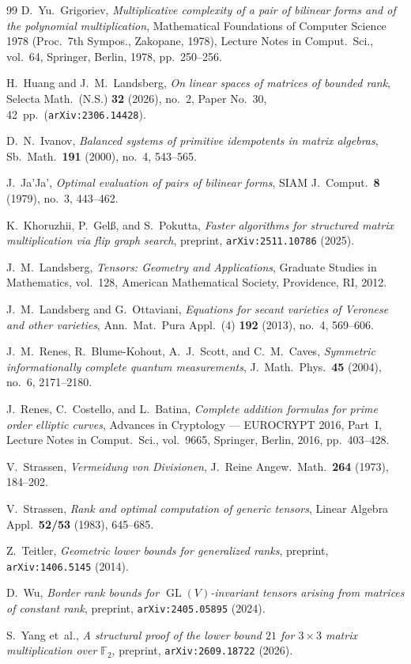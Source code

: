 \documentclass[11pt,reqno]{amsart}
\theoremstyle{definition}
\theoremstyle{remark}
\numberwithin{equation}{section}
\newcommand{\FF}{\mathbb{F}}
\DeclareMathOperator{\GL}{GL}
\begin{document}
\begin{thebibliography}{99}
D.~Yu.~Grigoriev,
\emph{Multiplicative complexity of a pair of bilinear forms and of the polynomial multiplication},
Mathematical Foundations of Computer Science 1978 (Proc.\ 7th Sympos., Zakopane, 1978),
Lecture Notes in Comput.\ Sci., vol.~64, Springer, Berlin, 1978, pp.~250--256.

H.~Huang and J.~M.~Landsberg,
\emph{On linear spaces of matrices of bounded rank},
Selecta Math.\ (N.S.) \textbf{32} (2026), no.~2, Paper No.~30, 42~pp.\ (\texttt{arXiv:2306.14428}).

D.~N.~Ivanov,
\emph{Balanced systems of primitive idempotents in matrix algebras},
Sb.\ Math.\ \textbf{191} (2000), no.~4, 543--565.

J.~Ja'Ja',
\emph{Optimal evaluation of pairs of bilinear forms},
SIAM J.\ Comput.\ \textbf{8} (1979), no.~3, 443--462.

K.~Khoruzhii, P.~Gel\ss, and S.~Pokutta,
\emph{Faster algorithms for structured matrix multiplication via flip graph search},
preprint, \texttt{arXiv:2511.10786} (2025).

J.~M.~Landsberg,
\emph{Tensors: Geometry and Applications},
Graduate Studies in Mathematics, vol.~128,
American Mathematical Society, Providence, RI, 2012.

J.~M.~Landsberg and G.~Ottaviani,
\emph{Equations for secant varieties of Veronese and other varieties},
Ann.\ Mat.\ Pura Appl.\ (4) \textbf{192} (2013), no.~4, 569--606.

J.~M.~Renes, R.~Blume-Kohout, A.~J.~Scott, and C.~M.~Caves,
\emph{Symmetric informationally complete quantum measurements},
J.~Math.\ Phys.\ \textbf{45} (2004), no.~6, 2171--2180.

J.~Renes, C.~Costello, and L.~Batina,
\emph{Complete addition formulas for prime order elliptic curves},
Advances in Cryptology --- EUROCRYPT 2016, Part~I,
Lecture Notes in Comput.\ Sci., vol.~9665, Springer, Berlin, 2016, pp.~403--428.

V.~Strassen,
\emph{Vermeidung von Divisionen},
J.~Reine Angew.\ Math.\ \textbf{264} (1973), 184--202.

V.~Strassen,
\emph{Rank and optimal computation of generic tensors},
Linear Algebra Appl.\ \textbf{52/53} (1983), 645--685.

Z.~Teitler,
\emph{Geometric lower bounds for generalized ranks},
preprint, \texttt{arXiv:1406.5145} (2014).

D.~Wu,
\emph{Border rank bounds for $\GL(V)$-invariant tensors arising from matrices of constant rank},
preprint, \texttt{arXiv:2405.05895} (2024).

S.~Yang et~al.,
\emph{A structural proof of the lower bound $21$ for $3 \times 3$ matrix multiplication over $\FF_2$},
preprint, \texttt{arXiv:2609.18722} (2026).

\end{thebibliography}
\end{document}
